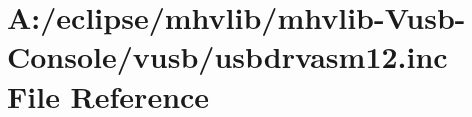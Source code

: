 \hypertarget{mhvlib-_vusb-_console_2vusb_2usbdrvasm12_8inc}{\section{A\-:/eclipse/mhvlib/mhvlib-\/\-Vusb-\/\-Console/vusb/usbdrvasm12.inc File Reference}
\label{mhvlib-_vusb-_console_2vusb_2usbdrvasm12_8inc}
}
